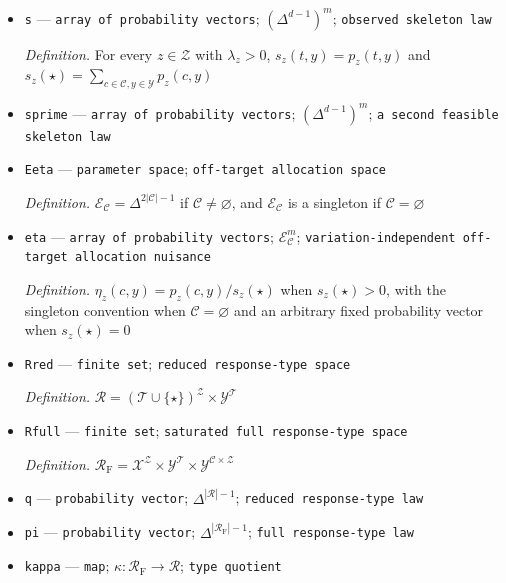 \documentclass{article}
\begin{document}
\begin{itemize}
  \par\smallskip\noindent\emph{Definition.} \(d=2|\mathcal T|+1=|\mathcal D|\)
  \item \texttt{s} --- \texttt{array of probability vectors}; \((\Delta^{d-1})^{m}\); \texttt{observed skeleton law}
  \par\smallskip\noindent\emph{Definition.} For every \(z\in\mathcal Z\) with \(\lambda_z>0\), \(s_z(t,y)=p_z(t,y)\) and \(s_z(\star)=\sum_{c\in\mathcal C,y\in\mathcal Y}p_z(c,y)\)
  \item \texttt{sprime} --- \texttt{array of probability vectors}; \((\Delta^{d-1})^{m}\); \texttt{a second feasible skeleton law}
  \item \texttt{Eeta} --- \texttt{parameter space}; \texttt{off-\allowbreak{}target allocation space}
  \par\smallskip\noindent\emph{Definition.} \(\mathcal E_{\mathcal C}=\Delta^{2|\mathcal C|-1}\) if \(\mathcal C\ne\varnothing\), and \(\mathcal E_{\mathcal C}\) is a singleton if \(\mathcal C=\varnothing\)
  \item \texttt{eta} --- \texttt{array of probability vectors}; \(\mathcal E_{\mathcal C}^{m}\); \texttt{variation-\allowbreak{}independent off-\allowbreak{}target allocation nuisance}
  \par\smallskip\noindent\emph{Definition.} \(\eta_z(c,y)=p_z(c,y)/s_z(\star)\) when \(s_z(\star)>0\), with the singleton convention when \(\mathcal C=\varnothing\) and an arbitrary fixed probability vector when \(s_z(\star)=0\)
  \item \texttt{Rred} --- \texttt{finite set}; \texttt{reduced response-\allowbreak{}type space}
  \par\smallskip\noindent\emph{Definition.} \(\mathcal R=(\mathcal T\cup\{\star\})^{\mathcal Z}\times\mathcal Y^{\mathcal T}\)
  \item \texttt{Rfull} --- \texttt{finite set}; \texttt{saturated full response-\allowbreak{}type space}
  \par\smallskip\noindent\emph{Definition.} \(\mathcal R_{\mathrm F}=\mathcal X^{\mathcal Z}\times\mathcal Y^{\mathcal T}\times\mathcal Y^{\mathcal C\times\mathcal Z}\)
  \item \texttt{q} --- \texttt{probability vector}; \(\Delta^{|\mathcal R|-1}\); \texttt{reduced response-\allowbreak{}type law}
  \item \texttt{pi} --- \texttt{probability vector}; \(\Delta^{|\mathcal R_{\mathrm F}|-1}\); \texttt{full response-\allowbreak{}type law}
  \item \texttt{kappa} --- \texttt{map}; \(\kappa:\mathcal R_{\mathrm F}\to\mathcal R\); \texttt{type quotient}

\end{itemize}
\end{document}
